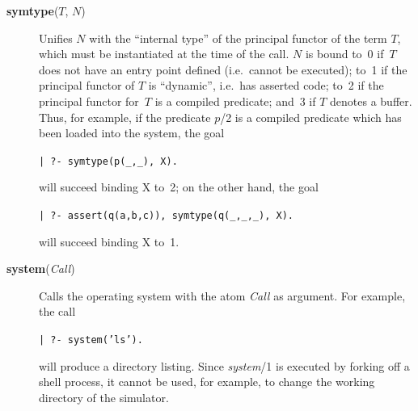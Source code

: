 \begin{description}
\item[{\bf symtype}($T$, $N$)] 
    Unifies $N$ with the ``internal type'' of the principal functor of the term
    $T$, which must be instantiated at the time of the call.
    $N$ is bound to~0 if~$T$ does not have an entry point defined
    (i.e.\ cannot be executed);
    to~1 if the principal functor of $T$ is ``dynamic'',
    i.e.\ has asserted code;
    to~2 if the principal functor for~$T$ is a compiled predicate;
    and~3 if $T$ denotes a buffer.
    Thus, for example, if the predicate $p$/2
    is a compiled predicate which has been loaded into the system, the goal
    \begin{center}
    {\tt | ?- symtype(p(\_,\_), X).}
    \end{center}
    will succeed binding X to~2; on the other hand, the goal
    \begin{center}
    {\tt | ?- assert(q(a,b,c)), symtype(q(\_,\_,\_), X).}
    \end{center}
    will succeed binding X to~1.

\item[{\bf system}({\em Call})] 
    Calls the operating system with the atom {\em Call} as argument.
    For example, the call
    \begin{center}
    {\tt | ?- system('ls').}
    \end{center}
    will produce a directory listing.
    Since {\em system}/1 is executed by forking off a shell process,
    it cannot be used, for example, to change the working
    directory of the simulator.


\end{description}
